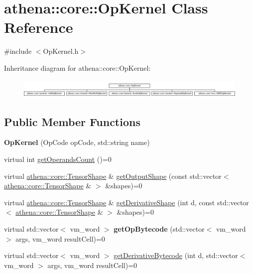 \hypertarget{classathena_1_1core_1_1_op_kernel}{}\section{athena\+:\+:core\+:\+:Op\+Kernel Class Reference}
\label{classathena_1_1core_1_1_op_kernel}


{\ttfamily \#include $<$Op\+Kernel.\+h$>$}

Inheritance diagram for athena\+:\+:core\+:\+:Op\+Kernel\+:\begin{figure}[H]
\begin{center}
\leavevmode
\includegraphics[height=0.929461cm]{classathena_1_1core_1_1_op_kernel}
\end{center}
\end{figure}
\subsection*{Public Member Functions}
\begin{DoxyCompactItemize}
\item 
\mbox{\label{classathena_1_1core_1_1_op_kernel_a1adf0c5c97ce4d3e9c0155ea4bf48ab5}} 
{\bfseries Op\+Kernel} (Op\+Code op\+Code, std\+::string name)
\item 
virtual int \mbox{\hyperlink{classathena_1_1core_1_1_op_kernel_add97d4c132d80ecd9915acfedf7c9119}{get\+Operands\+Count}} ()=0
\item 
virtual \mbox{\hyperlink{classathena_1_1core_1_1_tensor_shape}{athena\+::core\+::\+Tensor\+Shape}} \& \mbox{\hyperlink{classathena_1_1core_1_1_op_kernel_a926afa57c90b4a999419cbbdc0496c65}{get\+Output\+Shape}} (const std\+::vector$<$ \mbox{\hyperlink{classathena_1_1core_1_1_tensor_shape}{athena\+::core\+::\+Tensor\+Shape}} \& $>$ \&shapes)=0
\item 
virtual \mbox{\hyperlink{classathena_1_1core_1_1_tensor_shape}{athena\+::core\+::\+Tensor\+Shape}} \& \mbox{\hyperlink{classathena_1_1core_1_1_op_kernel_aa2367d955810d4e0f3f27b85ae6fe85a}{get\+Derivative\+Shape}} (int d, const std\+::vector$<$ \mbox{\hyperlink{classathena_1_1core_1_1_tensor_shape}{athena\+::core\+::\+Tensor\+Shape}} \& $>$ \&shapes)=0
\item 
\mbox{\label{classathena_1_1core_1_1_op_kernel_a181a03e0a038151fda074a8c950f3003}} 
virtual std\+::vector$<$ vm\+\_\+word $>$ {\bfseries get\+Op\+Bytecode} (std\+::vector$<$ vm\+\_\+word $>$ args, vm\+\_\+word result\+Cell)=0
\item 
virtual std\+::vector$<$ vm\+\_\+word $>$ \mbox{\hyperlink{classathena_1_1core_1_1_op_kernel_ad500db1afc5a7c10acff8ecb8f1bee4d}{get\+Derivative\+Bytecode}} (int d, std\+::vector$<$ vm\+\_\+word $>$ args, vm\+\_\+word result\+Cell)=0
\end{DoxyCompactItemize}
